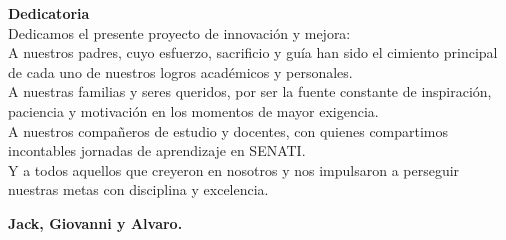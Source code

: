 {}

\vspace*{1.5cm} %

\noindent\hspace{0.42\textwidth}%
\begin{minipage}{0.53\textwidth}

{\large\bfseries Dedicatoria}\\[0.8em]

Dedicamos el presente proyecto de innovación y mejora:\\[0.8em]

A nuestros padres, cuyo esfuerzo, sacrificio y guía han sido el cimiento principal de cada uno de nuestros logros académicos y personales.\\[0.8em]

A nuestras familias y seres queridos, por ser la fuente constante de inspiración, paciencia y motivación en los momentos de mayor exigencia.\\[0.8em]

A nuestros compañeros de estudio y docentes, con quienes compartimos incontables jornadas de aprendizaje en SENATI.\\[0.8em]

Y a todos aquellos que creyeron en nosotros y nos impulsaron a perseguir nuestras metas con disciplina y excelencia.\\[1.5em]

\begin{flushright}
\textbf{Jack, Giovanni y Alvaro.}
\end{flushright}

\end{minipage}